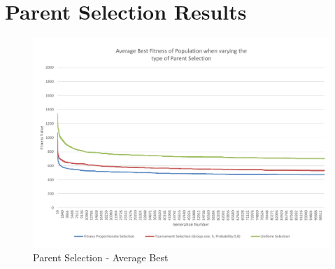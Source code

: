
\section{Parent Selection Results} %
\label{sec:parent_selection_results}

\begin{landscape}
\begin{figure}[thbp]
	\centerline{\includegraphics[height=0.945\textwidth]{figures/CircleTests/ParentSelection/CircleTestParentSelectionAverageBest.pdf}}
	\caption{Parent Selection - Average Best}
	\label{fig:ctpsab}
\end{figure}
\end{landscape}

